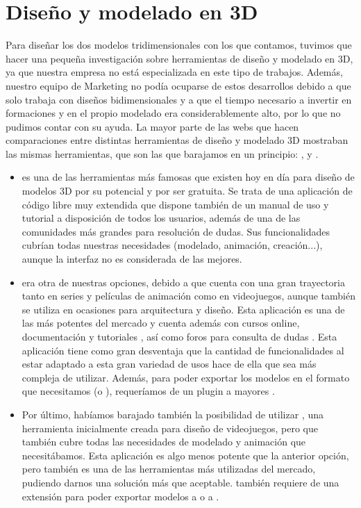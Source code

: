 \documentclass{subfiles}
\begin{document}
  \chapter{Diseño y modelado en 3D}
  \label{chap:diseno_y_modelado_en_3d}

    Para diseñar los dos modelos tridimensionales con los que contamos, tuvimos que hacer una pequeña investigación sobre herramientas de diseño y modelado en 3D, ya que nuestra empresa no está especializada en este tipo de trabajos. Además, nuestro equipo de Marketing no podía ocuparse de estos desarrollos debido a que solo trabaja con diseños bidimensionales y a que el tiempo necesario a invertir en formaciones y en el propio modelado era considerablemente alto, por lo que no pudimos contar con su ayuda. La mayor parte de las webs que hacen comparaciones entre distintas herramientas de diseño y modelado 3D mostraban las mismas herramientas, que son las que barajamos en un principio: \blender \cite{web:blender}, \unreal \cite{web:unreal} y \unity \cite{web:unity}.

    \begin{itemize}
        \item \textbf{\blender} es una de las herramientas más famosas que existen hoy en día para diseño de modelos 3D por su potencial y por ser gratuita. Se trata de una aplicación de código libre muy extendida que dispone también de un manual de uso y tutorial \cite{web:blender_manual} a disposición de todos los usuarios, además de una de las comunidades más grandes para resolución de dudas. Sus funcionalidades cubrían todas nuestras necesidades (modelado, animación, creación...), aunque la interfaz no es considerada de las mejores.
        
        \item \textbf{\unreal} era otra de nuestras opciones, debido a que cuenta con una gran trayectoria tanto en series y películas de animación como en videojuegos, aunque también se utiliza en ocasiones para arquitectura y diseño. Esta aplicación es una de las más potentes del mercado y cuenta además con cursos online, documentación y tutoriales \cite{web:unreal_learn}, así como foros para consulta de dudas \cite{web:unreal_forum}. Esta aplicación tiene como gran desventaja que la cantidad de funcionalidades al estar adaptado a esta gran variedad de usos hace de ella que sea más compleja de utilizar. Además, para poder exportar los modelos en el formato que necesitamos (\gltf o \glb), requeríamos de un plugin a mayores \cite{web:unreal_plugin}.
        
        \item Por último, habíamos barajado también la posibilidad de utilizar \textbf{\unity}, una herramienta inicialmente creada para diseño de videojuegos, pero que también cubre todas las necesidades de modelado y animación que necesitábamos. Esta aplicación es algo menos potente que la anterior opción, pero también es una de las herramientas más utilizadas del mercado, pudiendo darnos una solución más que aceptable. \unity también requiere de una extensión para poder exportar modelos a \glb o a \gltf \cite{web:unity_plugin}.
    \end{itemize}
\end{document}
